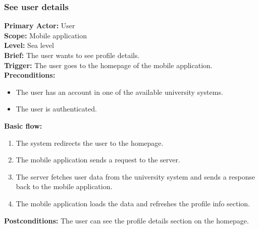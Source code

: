 \subsubsection{\large{See user details}}
\textbf{Primary Actor:} User\\
\textbf{Scope:} Mobile application\\
\textbf{Level:} Sea level\\
\textbf{Brief:} The user wants to see profile details.\\
\textbf{Trigger:} The user goes to the homepage of the mobile application.\\
\textbf{Preconditions:}
\begin{itemize}
    \item The user has an account in one of the available university systems.
    \item The user is authenticated.
\end{itemize}
\textbf{Basic flow:}
\begin{enumerate}
    \item The system redirects the user to the homepage.
    \item The mobile application sends a request to the server.
    \item The server fetches user data from the university system and sends a response back to the mobile application.
    \item The mobile application loads the data and refreshes the profile info section.
\end{enumerate}
\textbf{Postconditions:}
The user can see the profile details section on the homepage.
